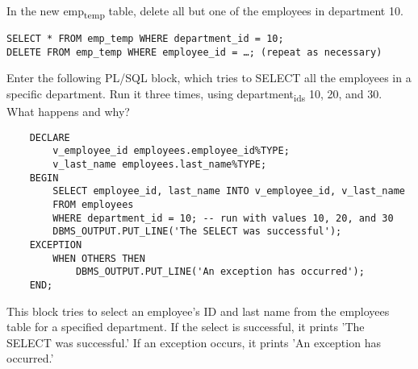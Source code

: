\documentclass[11pt]{article}
\begin{document}
In the new emp\textsubscript{temp} table, delete all but one of the employees in department 10.

\begin{verbatim}
SELECT * FROM emp_temp WHERE department_id = 10;
DELETE FROM emp_temp WHERE employee_id = …; (repeat as necessary)
\end{verbatim}

Enter the following PL/SQL block, which tries to SELECT all the employees in a specific department. Run it three times, using department\textsubscript{ids} 10, 20, and 30. What happens and why?

\begin{verbatim}
    DECLARE
        v_employee_id employees.employee_id%TYPE;
        v_last_name employees.last_name%TYPE;
    BEGIN
        SELECT employee_id, last_name INTO v_employee_id, v_last_name
        FROM employees
        WHERE department_id = 10; -- run with values 10, 20, and 30
        DBMS_OUTPUT.PUT_LINE('The SELECT was successful');
    EXCEPTION
        WHEN OTHERS THEN
            DBMS_OUTPUT.PUT_LINE('An exception has occurred');
    END;
\end{verbatim}

This block tries to select an employee's ID and last name from the employees table for a specified department. If the select is successful, it prints 'The SELECT was successful.' If an exception occurs, it prints 'An exception has occurred.'
\end{document}

